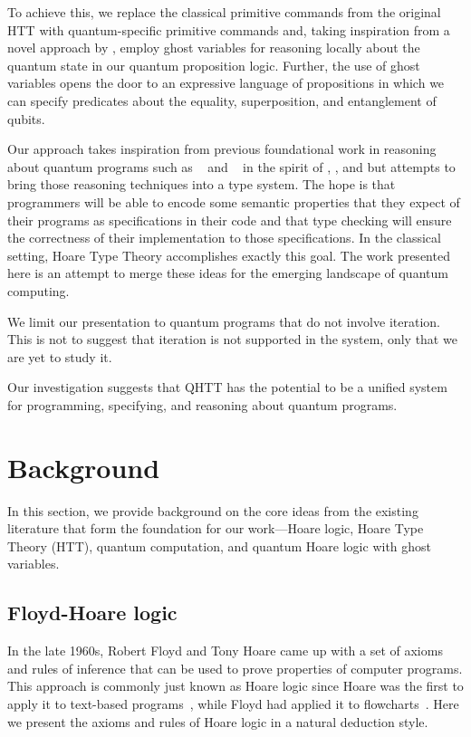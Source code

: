 \documentclass[adraft,creativecommons]{eptcs}
\theoremstyle{definition}
\theoremstyle{remark}
\begin{document}
To achieve this, we replace the classical primitive commands from the original HTT with quantum-specific primitive commands and, taking inspiration from a novel approach by \textcite{unruh2019}, employ ghost variables for reasoning locally about the quantum state in our quantum proposition logic. Further, the use of ghost variables opens the door to an expressive language of propositions in which we can specify predicates about the equality, superposition, and entanglement of qubits.

Our approach takes inspiration from previous foundational work in reasoning about quantum programs such as ~\parencite{dhondt2006} and ~\parencite{floydhoare2012} in the spirit of \textcite{hoare1969}, \textcite{dijkstra1976}, and \textcite{gries1981} but attempts to bring those reasoning techniques into a type system. The hope is that programmers will be able to encode some semantic properties that they expect of their programs as specifications in their code and that type checking will ensure the correctness of their implementation to those specifications. In the classical setting, Hoare Type Theory accomplishes exactly this goal. The work presented here is an attempt to merge these ideas for the emerging landscape of quantum computing.

We limit our presentation to quantum programs that do not involve iteration. This is not to suggest that iteration is not supported in the system, only that we are yet to study it.

Our investigation suggests that QHTT has the potential to be a unified system for programming, specifying, and reasoning about quantum programs.

\section{Background}
In this section, we provide background on the core ideas from the existing literature that form the foundation for our work---Hoare logic, Hoare Type Theory (HTT), quantum computation, and quantum Hoare logic with ghost variables.

\subsection{Floyd-Hoare logic}
In the late 1960s, Robert Floyd and Tony Hoare came up with a set of axioms and rules of inference that can be used to prove properties of computer programs. This approach is commonly just known as Hoare logic since Hoare was the first to apply it to text-based programs~\parencite{hoare1969}, while Floyd had applied it to flowcharts~\parencite{floyd67}. Here we present the axioms and rules of Hoare logic in a natural deduction style.
\end{document}
